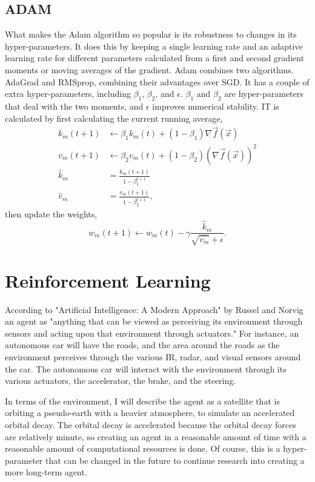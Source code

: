 \subsection{ADAM}

What makes the Adam algorithm so popular is its robustness to changes in its hyper-parameters. It does this by keeping a single learning rate and an adaptive learning rate for different parameters calculated from a first and second gradient moments or moving averages of the gradient. Adam combines two algorithms. AdaGrad and RMSprop, combining their advantages over SGD. It has a couple of extra hyper-parameters, including $\beta_1$, $\beta_2$, and $\epsilon$. $\beta_1$ and $\beta_2$ are hyper-parameters that deal with the two moments, and $\epsilon$ improves numerical stability. IT is calculated by first calculating the current running average, \begin{align*}
	k_m(t+1)&\leftarrow \beta_1 k_m(t)+(1-\beta_1)\nabla \vec{f}(\vec{x})\\
	v_m(t+1)&\leftarrow \beta_2 v_m(t)+(1-\beta_2)(\nabla \vec{f}(\vec{x}))^2\\
	\hat{k}_m&=\frac{k_m(t+1)}{1-\beta_1^{t+1}}\\
	\hat{v}_m&=\frac{v_m(t+1)}{1-\beta_2^{t+1}},
\end{align*} then update the weights, 
$$w_m(t+1)\leftarrow w_m(t)-\gamma\frac{\hat{k}_m}{\sqrt{\hat{v_m}}+\epsilon}.$$

\section{Reinforcement Learning}

According to "Artificial Intelligence: A Modern Approach" by Russel and Norvig an agent as "anything that can be viewed as perceiving its environment through sensors and acting upon that environment through actuators." For instance, an autonomous car will have the roads, and the area around the roads as the environment perceives through the various IR, radar, and visual sensors around the car. The autonomous car will interact with the environment through its various actuators, the accelerator, the brake, and the steering. 

In terms of the environment, I will describe the agent as a satellite that is orbiting a pseudo-earth with a heavier atmosphere, to simulate an accelerated orbital decay. The orbital decay is accelerated because the orbital decay forces are relatively minute, so creating an agent in a reasonable amount of time with a reasonable amount of computational resources is done. Of course, this is a hyper-parameter that can be changed in the future to continue research into creating a more long-term agent.  


